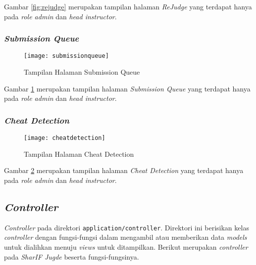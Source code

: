 Gambar \ref{fig:rejudge} merupakan tampilan halaman \textit{ReJudge} yang terdapat hanya pada \textit{role admin} dan \textit{head instructor}.

\subsubsection{\textit{Submission Queue}}
\begin{figure}[H]
	\centering  
	\texttt{[image: submissionqueue]}  
	\caption[Tampilan Halaman \textit{Submission Queue}]{Tampilan Halaman Submission Queue} 
	\label{fig:submissionqueue} 
\end{figure}

Gambar \ref{fig:submissionqueue} merupakan tampilan halaman \textit{Submission Queue} yang terdapat hanya pada \textit{role admin} dan \textit{head instructor}.

\subsubsection{\textit{Cheat Detection}}
\begin{figure}[H]
	\centering  
	\texttt{[image: cheatdetection]}  
	\caption[Tampilan Halaman \textit{Cheat Detection}]{Tampilan Halaman Cheat Detection} 
	\label{fig:cheatdetection} 
\end{figure}

Gambar \ref{fig:cheatdetection} merupakan tampilan halaman \textit{Cheat Detection} yang terdapat hanya pada \textit{role admin} dan \textit{head instructor}.

\subsection{\textit{Controller}}
\textit{Controller} pada direktori \texttt{application/controller}. Direktori ini berisikan kelas \textit{controller} dengan fungsi-fungsi dalam mengambil atau memberikan data \textit{models} untuk dialihkan menuju \textit{views} untuk ditampilkan. Berikut merupakan \textit{controller} pada \textit{SharIF Jugde} beserta fungsi-fungsinya.
